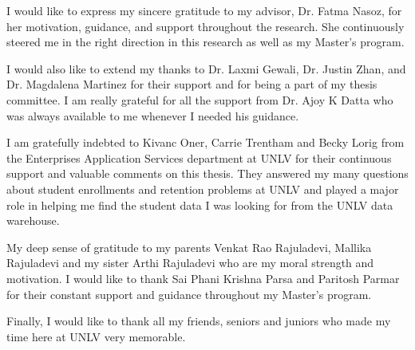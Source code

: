 \documentclass[11pt,openright]{report}
\begin{document}


\begin{thesisacknowledgments}
I would like to express my sincere gratitude to my advisor, Dr. Fatma Nasoz, for her motivation, guidance, and support throughout the research. She continuously steered me in the right direction in this research as well as my Master's program.

I would also like to extend my thanks to Dr. Laxmi Gewali, Dr. Justin Zhan, and Dr. Magdalena Martinez for their support and for being a part of my thesis committee. I am really grateful for all the support from Dr. Ajoy K Datta who was always available to me whenever I needed his guidance.

I am gratefully indebted to Kivanc Oner, Carrie Trentham and Becky Lorig from the Enterprises Application Services department at UNLV for their continuous support and valuable comments on this thesis. They answered my many questions about student enrollments and retention problems at UNLV and played a major role in helping me find the student data I was looking for from the UNLV data warehouse.

My deep sense of gratitude to my parents Venkat Rao Rajuladevi, Mallika Rajuladevi and my sister Arthi Rajuladevi who are my moral strength and motivation. I would like to thank Sai Phani Krishna Parsa and Paritosh Parmar for their constant support and guidance throughout my Master's program.

Finally, I would like to thank all my friends, seniors and juniors who made my time here at UNLV very memorable. 
\end{thesisacknowledgments}

\pagestyle{plain}

\tableofcontents
\clearpage
\listoftables
\clearpage
\listoffigures
\clearpage
\clearpage
\end{document}
